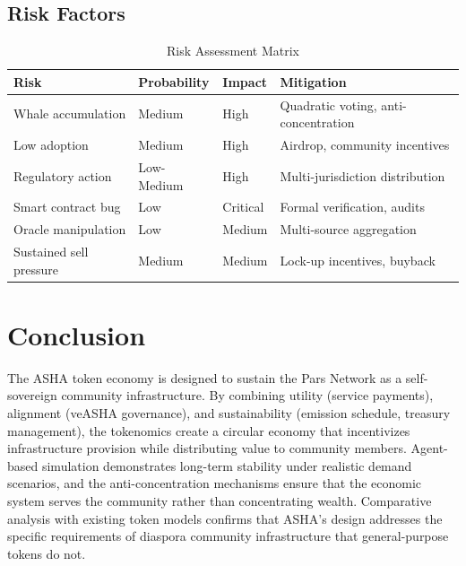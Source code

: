 \documentclass[11pt,a4paper]{article}
\newcommand{\asha}{\textsc{ASHA}\xspace}
\begin{document}
\subsection{Risk Factors}

\begin{table}[H]
\centering
\caption{Risk Assessment Matrix}
\label{tab:risk}
\begin{tabular}{llll}
\toprule
\textbf{Risk} & \textbf{Probability} & \textbf{Impact} & \textbf{Mitigation} \\
\midrule
Whale accumulation & Medium & High & Quadratic voting, anti-concentration \\
Low adoption & Medium & High & Airdrop, community incentives \\
Regulatory action & Low-Medium & High & Multi-jurisdiction distribution \\
Smart contract bug & Low & Critical & Formal verification, audits \\
Oracle manipulation & Low & Medium & Multi-source aggregation \\
Sustained sell pressure & Medium & Medium & Lock-up incentives, buyback \\
\bottomrule
\end{tabular}
\end{table}

\section{Conclusion}

The \asha token economy is designed to sustain the Pars Network as a self-sovereign community infrastructure. By combining utility (service payments), alignment (veASHA governance), and sustainability (emission schedule, treasury management), the tokenomics create a circular economy that incentivizes infrastructure provision while distributing value to community members. Agent-based simulation demonstrates long-term stability under realistic demand scenarios, and the anti-concentration mechanisms ensure that the economic system serves the community rather than concentrating wealth. Comparative analysis with existing token models confirms that ASHA's design addresses the specific requirements of diaspora community infrastructure that general-purpose tokens do not.


\end{document}
